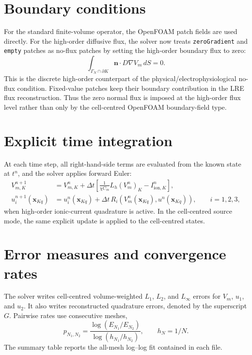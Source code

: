 \documentclass[11pt,a4paper]{article}
\newcommand{\code}[1]{\texttt{#1}}
\begin{document}
\section{Boundary conditions}
For the standard finite-volume operator, the OpenFOAM patch fields are used directly. For the high-order diffusive flux, the solver now treats \code{zeroGradient} and \code{empty} patches as no-flux patches by setting the high-order boundary flux to zero:
\begin{equation}
\int_{\Gamma_N\cap\partial K}\mathbf{n}\cdot D\nabla V_m\,dS = 0.
\end{equation}
This is the discrete high-order counterpart of the physical/electrophysiological no-flux condition. Fixed-value patches keep their boundary contribution in the LRE flux reconstruction. Thus the zero normal flux is imposed at the high-order flux level rather than only by the cell-centred OpenFOAM boundary-field type.

\section{Explicit time integration}
At each time step, all right-hand-side terms are evaluated from the known state at $t^n$, and the solver applies forward Euler:
\begin{align}
V_{m,K}^{n+1}
&= V_{m,K}^{n}
+ \Delta t\left[
\frac{1}{\chi C_m}L_h(V_m^n)_K
- I_{\mathrm{ion},K}^n
\right],\\
u_i^{n+1}(\mathbf{x}_{Kq})
&= u_i^n(\mathbf{x}_{Kq})
+ \Delta t\,R_i\!\left(V_m^n(\mathbf{x}_{Kq}),u^n(\mathbf{x}_{Kq})\right),
\qquad i=1,2,3,
\end{align}
when high-order ionic-current quadrature is active. In the cell-centred source mode, the same explicit update is applied to the cell-centred states.

\section{Error measures and convergence rates}
The solver writes cell-centred volume-weighted $L_1$, $L_2$, and $L_\infty$ errors for $V_m$, $u_1$, and $u_2$. It also writes reconstructed quadrature errors, denoted by the superscript $G$. Pairwise rates use consecutive meshes,
\begin{equation}
p_{N_1,N_2}
=\frac{\log(E_{N_1}/E_{N_2})}{\log(h_{N_1}/h_{N_2})},
\qquad h_N = 1/N.
\end{equation}
The summary table reports the all-mesh log--log fit contained in each  file.
\end{document}

